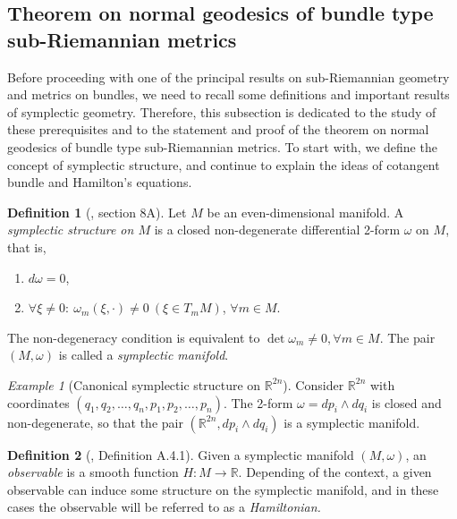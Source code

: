 \documentclass[12pt, letterpaper, reqno]{amsart}
\theoremstyle{definition}
\newtheorem{df}{Definition}
\theoremstyle{plain}
\theoremstyle{remark}
\newtheorem{ex}{Example}
\begin{document}
\subsection{Theorem on normal geodesics of bundle type sub-Riemannian metrics}
\label{sub:theorem_on_normal_geodesics}
Before proceeding with one of the principal results on sub-Riemannian geometry and metrics on bundles, we need to recall some definitions and important results of symplectic geometry. Therefore, this subsection is dedicated to the study of these prerequisites and to the statement and proof of the theorem on normal geodesics of bundle type sub-Riemannian metrics. To start with, we define the concept of symplectic structure, and continue to explain the ideas of cotangent bundle and Hamilton's equations.
\begin{df}[\cite{arnol2013mathematical}, section 8A]
	Let $ M $ be an even-dimensional manifold. A \textit{symplectic structure on $ M $ } is a closed non-degenerate differential 2-form $ \omega $ on $ M $, that is, 
	\begin{enumerate}
		\item $ d\omega=0 $,
		\item $\forall \xi \neq 0: \ \omega_m(\xi,\cdot)\neq0 \ (\xi\in T_m M)$, $ \forall m \in M. $  
	  
	\end{enumerate}
	The non-degeneracy condition is equivalent to $ \operatorname{det} \omega_m\neq 0, \forall m\in M $. The pair $ (M,\omega) $ is called a \textit{symplectic manifold}. 
\end{df}

\begin{ex}[Canonical symplectic structure on $ \mathbb{R}^{2n}$]
	Consider $ \mathbb{R}^{2n} $ with coordinates $ (q_1,q_2,\dots,q_n,p_1,p_2,\dots,p_n) $. The 2-form $ \omega = dp_i\wedge dq_i $ is closed and non-degenerate, so that the pair $ ( \mathbb{R}^{2n}, dp_i\wedge dq_i) $ is a symplectic manifold.  
\end{ex}

\begin{df}[\cite{montgomery2002tour}, Definition A.4.1]
	Given a symplectic manifold  $ (M,\omega) $, an \textit{observable} is a smooth function $ H: M \rightarrow \mathbb{R}. $ Depending of the context, a given observable can induce some structure on the symplectic manifold, and in these cases the observable will be referred to as a \textit{Hamiltonian.} 
\end{df}
\end{document}
